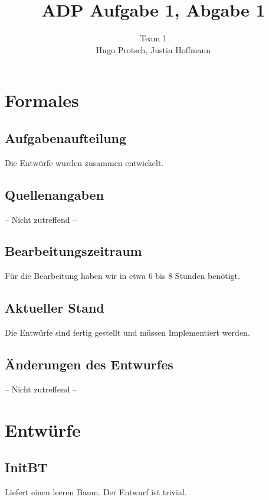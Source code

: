 \documentclass[11pt]{article}
\title{ADP Aufgabe 1, Abgabe 1}
\author{Team 1\\Hugo Protsch, Justin Hoffmann}
\begin{document}
    \maketitle


    \section{Formales}\label{sec:Formales}


    \subsection{Aufgabenaufteilung}
    Die Entwürfe wurden zusammen entwickelt.

    \subsection{Quellenangaben}
    -- Nicht zutreffend --


    \subsection{Bearbeitungszeitraum}
    Für die Bearbeitung haben wir in etwa 6 bis 8 Stunden benötigt.

    \subsection{Aktueller Stand}
    Die Entwürfe sind fertig gestellt und müssen Implementiert werden.


    \subsection{Änderungen des Entwurfes}
    -- Nicht zutreffend --


    \section{Entwürfe}\label{sec:entwürfe}

    \subsection{InitBT}
    Liefert einen leeren Baum.
    Der Entwurf ist trivial.
\end{document}

